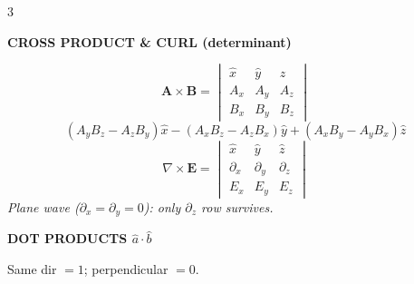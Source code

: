 \documentclass[6pt,letterpaper]{article}
\newcommand{\shead}[3]{%
  \noindent\colorbox{#1}{\parbox{\dimexpr\linewidth-2\fboxsep\relax}%
  {\color{#2}\bfseries\fontsize{6}{7}\selectfont #3}}\vspace{0.5pt}}
\begin{document}
\fontsize{6}{7}\selectfont

\begin{multicols}{3}

\shead{purplebg}{purple}{CROSS PRODUCT \& CURL (determinant)}
\begin{ebox}
\[\mathbf{A}\times\mathbf{B}=
\begin{vmatrix}\hat{x}&\hat{y}&\hat{z}\\A_x&A_y&A_z\\B_x&B_y&B_z\end{vmatrix}\]
\[(A_yB_z\!-\!A_zB_y)\hat{x}-(A_xB_z\!-\!A_zB_x)\hat{y}+(A_xB_y\!-\!A_yB_x)\hat{z}\]
\[\nabla\times\mathbf{E}=
\begin{vmatrix}\hat{x}&\hat{y}&\hat{z}\\\partial_x&\partial_y&\partial_z\\E_x&E_y&E_z\end{vmatrix}\]
\textit{Plane wave ($\partial_x\!=\!\partial_y\!=\!0$): only $\partial_z$ row survives.}
\end{ebox}

\vspace{0.3pt}
\shead{purplebg}{purple}{DOT PRODUCTS $\hat{a}\cdot\hat{b}$}
\begin{ebox}
Same dir $=1$; perpendicular $=0$.\\[1pt]
{\centering{}\par}
\end{ebox}


\end{multicols}
\end{document}
